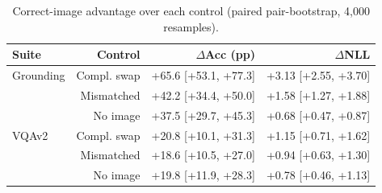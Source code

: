 \begin{table}[t]
\centering
\small
\begin{tabular}{lrrr}
\toprule
Suite & Control & $\Delta$Acc (pp) & $\Delta$NLL \\
\midrule
Grounding & Compl. swap & +65.6 [+53.1, +77.3] & +3.13 [+2.55, +3.70] \\
 & Mismatched & +42.2 [+34.4, +50.0] & +1.58 [+1.27, +1.88] \\
 & No image & +37.5 [+29.7, +45.3] & +0.68 [+0.47, +0.87] \\
VQAv2 & Compl. swap & +20.8 [+10.1, +31.3] & +1.15 [+0.71, +1.62] \\
 & Mismatched & +18.6 [+10.5, +27.0] & +0.94 [+0.63, +1.30] \\
 & No image & +19.8 [+11.9, +28.3] & +0.78 [+0.46, +1.13] \\
\bottomrule
\end{tabular}
\caption{Correct-image advantage over each control (paired pair-bootstrap, 4,000 resamples).}
\label{tab:t2-adv}
\end{table}

